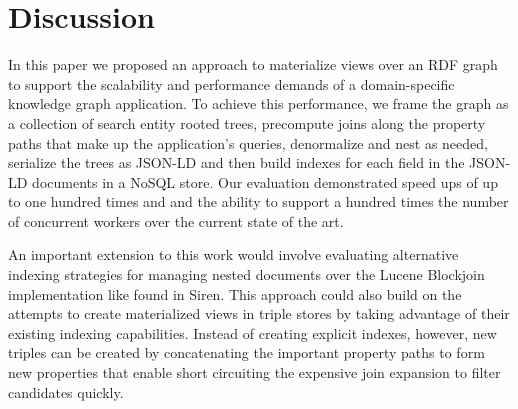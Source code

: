 \section{Discussion}
\label{sec:discussion}
In this paper we proposed an approach to materialize views over an RDF graph to support the scalability and performance demands of a domain-specific knowledge graph application.  
To achieve this performance, we frame the graph as a collection of search entity rooted trees, precompute joins along the property paths that make up the application's queries, denormalize and nest as needed, serialize the trees as JSON-LD and then build indexes for each field in the JSON-LD documents in a NoSQL store.  
Our evaluation demonstrated speed ups of up to one hundred times and and the ability to support a hundred times the number of concurrent workers over the current state of the art.

An important extension to this work would involve evaluating alternative indexing strategies for managing nested documents over the Lucene Blockjoin implementation like found in Siren\cite{delbru2010node}.  
This approach could also build on the attempts to create materialized views in triple stores\cite{castillo2010rdfmatview} by taking advantage of their existing indexing capabilities.  
Instead of creating explicit indexes, however, new triples can be created by concatenating the important property paths to form new properties that enable short circuiting the expensive join expansion to filter candidates quickly.  

